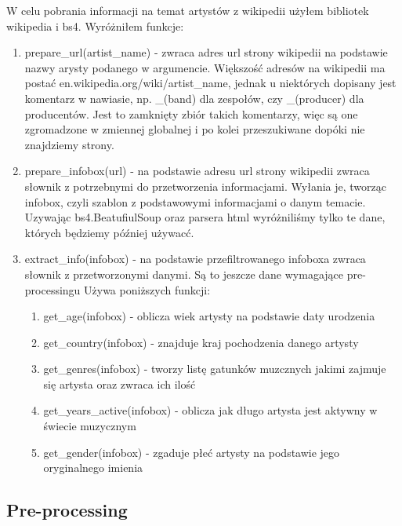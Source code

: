 \documentclass[12pt, letterpaper]{article}
\begin{document}
W celu pobrania informacji na temat artystów z wikipedii użyłem bibliotek wikipedia i bs4. Wyróżniłem funkcje:
\begin{enumerate}
    \item prepare\_url(artist\_name) - zwraca adres url strony wikipedii na podstawie nazwy arysty podanego w argumencie. Większość adresów na wikipedii ma postać en.wikipedia.org/wiki/artist\_name, jednak u niektórych dopisany jest komentarz w nawiasie, np. \_(band) dla zespołów, czy \_(producer) dla producentów. Jest to zamknięty zbiór takich komentarzy, więc są one zgromadzone w zmiennej globalnej i po kolei przeszukiwane dopóki nie znajdziemy strony.
    \item prepare\_infobox(url) - na podstawie adresu url strony wikipedii zwraca słownik z potrzebnymi do przetworzenia informacjami. Wyłania je, tworząc infobox, czyli szablon z podstawowymi informacjami o danym temacie. Uzywając bs4.BeatufiulSoup oraz parsera html wyróżniliśmy tylko te dane, których będziemy później używacć.
    \item extract\_info(infobox) - na podstawie przefiltrowanego infoboxa zwraca słownik z przetworzonymi danymi. Są to jeszcze dane wymagające pre-processingu Używa poniższych funkcji:
    \begin{enumerate}
        \item get\_age(infobox) - oblicza wiek artysty na podstawie daty urodzenia
        \item get\_country(infobox) - znajduje kraj pochodzenia danego artysty
        \item get\_genres(infobox) - tworzy listę gatunków muzcznych jakimi zajmuje się artysta oraz zwraca ich ilość
        \item get\_years\_active(infobox) - oblicza jak długo artysta jest aktywny w świecie muzycznym
        \item get\_gender(infobox) - zgaduje płeć artysty na podstawie jego oryginalnego imienia
    \end{enumerate}
\end{enumerate}

\subsection{Pre-processing}
\end{document}
